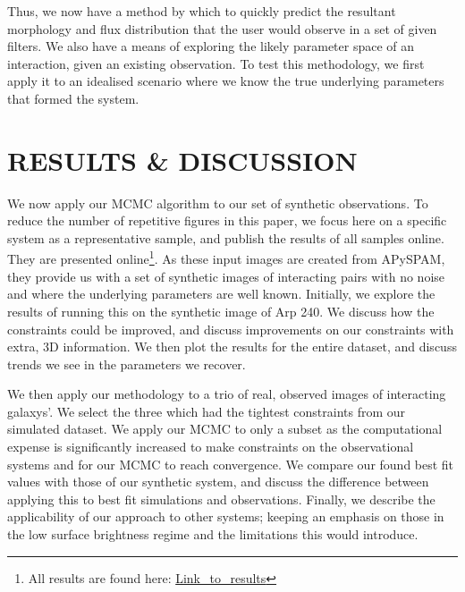Thus, we now have a method by which to quickly predict the resultant morphology and flux distribution that the user would observe in a set of given filters. We also have a means of exploring the likely parameter space of an interaction, given an existing observation. To test this methodology, we first apply it to an idealised scenario where we know the true underlying parameters that formed the system.


\section{RESULTS \& DISCUSSION}\label{Results}
\noindent We now apply our MCMC algorithm to our set of synthetic observations. To reduce the number of repetitive figures in this paper, we focus here on a specific system as a representative sample, and publish the results of all samples online. They are presented online\footnote{All results are found here: \url{Link_to_results}}. As these input images are created from APySPAM, they provide us with a set of synthetic images of interacting pairs with no noise and where the underlying parameters are well known. Initially, we explore the results of running this on the synthetic image of Arp 240. We discuss how the constraints could be improved, and discuss improvements on our constraints with extra, 3D information. We then plot the results for the entire dataset, and discuss trends we see in the parameters we recover.

We then apply our methodology to a trio of real, observed images of interacting galaxys'. We select the three which had the tightest constraints from our simulated dataset. We apply our MCMC to only a subset as the computational expense is significantly increased to make constraints on the observational systems and for our MCMC to reach convergence. We compare our found best fit values with those of our synthetic system, and discuss the difference between applying this to best fit simulations and observations. Finally, we describe the applicability of our approach to other systems; keeping an emphasis on those in the low surface brightness regime and the limitations this would introduce.


